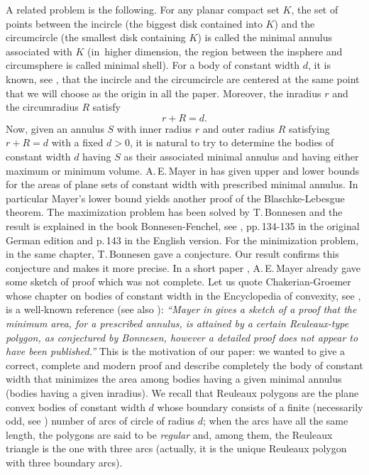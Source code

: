 A related problem is the following.
For any planar compact set $K$, the set of points between the incircle (the biggest disk contained into $K$) and the circumcircle (the smallest disk containing $K$) is
called the minimal {annulus} associated with $K$ {(in~higher dimension, the region between the insphere and circumsphere is called minimal shell).}
For a body of constant width $d$, it is known, see \cite{CG}, that the {incircle} and the {circumcircle} are centered at the
same point that we will choose as the origin in all the paper. Moreover, the inradius $r$ and the circumradius $R$
satisfy\vspace*{-3pt}%
\begin{equation}\label{inr}
r+R=d.
\end{equation}
Now, given an annulus $S$ with inner radius $r$ and outer radius $R$ satisfying $r+R=d$
with a fixed $d > 0$, it is natural to try to determine the bodies of
constant width $d$ having $S$ as their
associated minimal annulus and having either maximum or minimum volume.
A.\,E.\,Mayer in \cite{Ma1} has given upper
and lower bounds for the areas of plane sets of constant width with prescribed
minimal annulus. In particular Mayer's lower bound
yields another proof of the Blaschke-Lebesgue
theorem.
The maximization problem has been solved by T.\,Bonnesen and the result is explained in the book
Bonnesen-Fenchel, see \cite{BF}, pp.\,134-135 in the original German edition and p.\,143
in the English version.
For the minimization problem, in the same chapter, T.\,Bonnesen gave a conjecture.
Our result confirms this conjecture and makes it more precise. In a short paper
\cite{Ma2}, A.\,E.\,Mayer {already} gave some sketch of proof which was not complete.
Let us quote Chakerian-Groemer whose chapter on bodies of constant width in the Encyclopedia
of convexity, see \cite{CG}, is a well-known reference (see also \cite{MMO}):
\emph{``Mayer in \cite{Ma2} gives a sketch of a proof that the minimum
area, for a prescribed annulus, is attained by a certain Reuleaux-type polygon, as
conjectured by Bonnesen, however a detailed proof does not appear to have been
published.''}
This is the motivation of our paper: we wanted to give a correct, complete and modern proof
and describe completely the body of constant width that minimizes the area among bodies
having a given minimal annulus (\ie bodies having a given inradius).
We recall that Reuleaux polygons are the plane convex bodies of constant width $d$ whose boundary consists of a finite (necessarily odd, see \eg \cite[\S 8.1]{MMO}) number of arcs of circle of radius $d$; when the arcs have all the
same length, the polygons are said to be \emph{regular} and, among them, the Reuleaux triangle is the one with three arcs (actually, it is the unique Reuleaux polygon with three boundary arcs).

